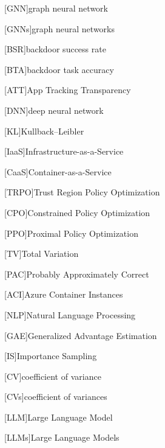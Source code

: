 [GNN]{graph neural network}
\newcommand{\GNN}{\ac{GNN}\xspace}

[GNNs]{graph neural networks}
\newcommand{\GNNs}{\acp{GNN}\xspace}

[BSR]{backdoor success rate}
\newcommand{\BSR}{\ac{BSR}\xspace}

[BTA]{backdoor task accuracy}
\newcommand{\BTA}{\ac{BTA}\xspace}

[ATT]{App Tracking Transparency}
\newcommand{\ATT}{\ac{ATT}\xspace}

[DNN]{deep neural network}
\newcommand{\DNN}{\ac{DNN}\xspace}

[KL]{Kullback–Leibler}
\newcommand{\KL}{\ac{KL}\xspace}

[IaaS]{Infrastructure-as-a-Service}
\newcommand{\IaaS}{\ac{IaaS}\xspace}

[CaaS]{Container-as-a-Service}
\newcommand{\CaaS}{\ac{CaaS}\xspace}

[TRPO]{Trust Region Policy Optimization}
\newcommand{\TRPO}{\ac{TRPO}\xspace}

[CPO]{Constrained Policy Optimization}
\newcommand{\CPO}{\ac{CPO}\xspace}

[PPO]{Proximal Policy Optimization}
\newcommand{\PPO}{\ac{PPO}\xspace}

[TV]{Total Variation}
\newcommand{\TV}{\ac{TV}\xspace}

[PAC]{Probably Approximately
Correct}
\newcommand{\PAC}{\ac{PAC}\xspace}

[ACI]{Azure Container Instances}
\newcommand{\ACI}{\ac{ACI}\xspace}

[NLP]{Natural Language Processing}
\newcommand{\NLP}{\ac{NLP}\xspace}

[GAE]{Generalized Advantage Estimation}
\newcommand{\GAE}{\ac{GAE}\xspace}

[IS]{Importance Sampling}
\newcommand{\IS}{\ac{IS}\xspace}

[CV]{coefficient of variance}
\newcommand{\CV}{\ac{CV}\xspace}

[CVs]{coefficient of variances}
\newcommand{\CVs}{\acp{CV}\xspace}

[LLM]{Large Language Model}
\newcommand{\LLM}{\ac{LLM}\xspace}

[LLMs]{Large Language Models}
\newcommand{\LLMs}{\acp{LLM}\xspace}

